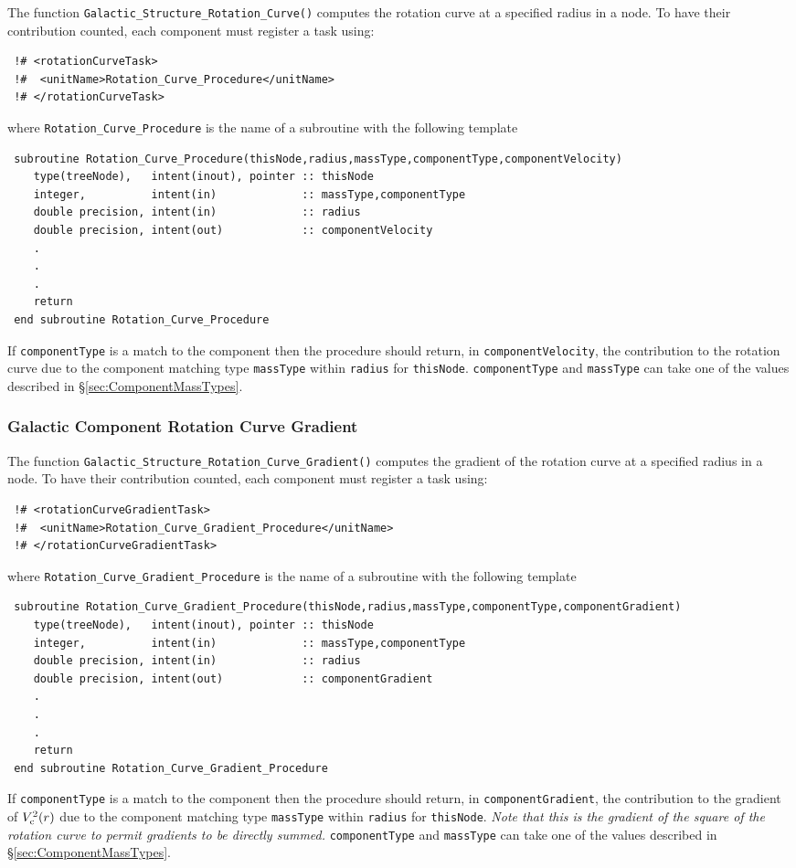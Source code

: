 The function {\tt Galactic\_Structure\_Rotation\_Curve()} computes the rotation curve at a specified radius in a node. To have their contribution counted, each component must register a task using:
\begin{verbatim}
 !# <rotationCurveTask>
 !#  <unitName>Rotation_Curve_Procedure</unitName>
 !# </rotationCurveTask>
\end{verbatim}
where {\tt Rotation\_Curve\_Procedure} is the name of a subroutine with the following template
\begin{verbatim}
 subroutine Rotation_Curve_Procedure(thisNode,radius,massType,componentType,componentVelocity)
    type(treeNode),   intent(inout), pointer :: thisNode
    integer,          intent(in)             :: massType,componentType
    double precision, intent(in)             :: radius
    double precision, intent(out)            :: componentVelocity
    .
    .
    .
    return
 end subroutine Rotation_Curve_Procedure
\end{verbatim}
If {\tt componentType} is a match to the component then the procedure should return, in {\tt componentVelocity}, the contribution to the rotation curve due to the component matching type {\tt massType} within {\tt radius} for {\tt thisNode}. {\tt componentType} and {\tt massType} can take one of the values described in \S\ref{sec:ComponentMassTypes}.

\subsubsection{Galactic Component Rotation Curve Gradient}

The function {\tt Galactic\_Structure\_Rotation\_Curve\_Gradient()} computes the gradient of the rotation curve at a specified radius in a node. To have their contribution counted, each component must register a task using:
\begin{verbatim}
 !# <rotationCurveGradientTask>
 !#  <unitName>Rotation_Curve_Gradient_Procedure</unitName>
 !# </rotationCurveGradientTask>
\end{verbatim}
where {\tt Rotation\_Curve\_Gradient\_Procedure} is the name of a subroutine with the following template
\begin{verbatim}
 subroutine Rotation_Curve_Gradient_Procedure(thisNode,radius,massType,componentType,componentGradient)
    type(treeNode),   intent(inout), pointer :: thisNode
    integer,          intent(in)             :: massType,componentType
    double precision, intent(in)             :: radius
    double precision, intent(out)            :: componentGradient
    .
    .
    .
    return
 end subroutine Rotation_Curve_Gradient_Procedure
\end{verbatim}
If {\tt componentType} is a match to the component then the procedure should return, in {\tt componentGradient}, the contribution to the gradient of $V_{\rm c}^2(r)$ due to the component matching type {\tt massType} within {\tt radius} for {\tt thisNode}. \emph{Note that this is the gradient of the square of the rotation curve to permit gradients to be directly summed.} {\tt componentType} and {\tt massType} can take one of the values described in \S\ref{sec:ComponentMassTypes}.

